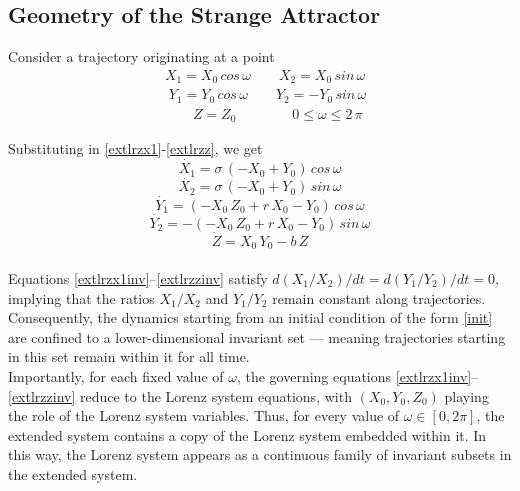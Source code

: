 \documentclass[paper=a4, fontsize=11pt]{scrartcl}
\numberwithin{equation}{section}		%
\numberwithin{figure}{section}			%
\numberwithin{table}{section}				%
\begin{document}
\subsection{Geometry of the Strange Attractor}
\noindent Consider a trajectory originating at a point 
\begin{equation}
	\begin{split}
		&X_1 = X_0 \, cos \, \omega \qquad X_2 = X_0 \, sin \, \omega \\
		& \; Y_1 = Y_0 \, cos \, \omega \qquad Y_2 = - Y_0 \, sin \, \omega \\
		& \qquad  Z = Z_0 \qquad \qquad  0 \leq \omega \leq 2 \, \pi
	\end{split} 
	\label{init}
\end{equation}

\noindent Substituting in \ref{extlrzx1}-\ref{extlrzz}, we get
\begin{equation}
	\dot{X_1} =  \sigma \, (-X_0 + Y_0) \, cos \, \omega
	\label{extlrzx1inv}
\end{equation}
\begin{equation}
	\dot{X_2} =  \sigma \, (-X_0 + Y_0) \, sin \, \omega
	\label{extlrzx2inv}
\end{equation}
\begin{equation}
	\dot{Y_1} = (-X_0 \, Z_0 + r \, X_0 - Y_0) \, cos \, \omega
	\label{extlrzy1inv}
\end{equation}
\begin{equation}
	\dot{Y_2} = -(-X_0 \, Z_0 + r \, X_0 - Y_0) \, sin \, \omega
	\label{extlrzy2inv}
\end{equation}
\begin{equation}
	\dot{Z} = X_0 \, Y_0 - b \, Z
	\label{extlrzzinv}
\end{equation}\\

Equations \ref{extlrzx1inv}–\ref{extlrzzinv} satisfy $d(X_1/X_2)/dt = d(Y_1/Y_2)/dt = 0$, implying that the ratios $X_1/X_2$ and $Y_1/Y_2$ remain constant along trajectories. Consequently, the dynamics starting from an initial condition of the form \eqref{init} are confined to a lower-dimensional invariant set — meaning trajectories starting in this set remain within it for all time.\\

Importantly, for each fixed value of $\omega$, the governing equations \ref{extlrzx1inv}–\ref{extlrzzinv} reduce to the Lorenz system equations, with $(X_0, Y_0, Z_0)$ playing the role of the Lorenz system variables. Thus, for every value of $\omega \in [0, 2\pi]$, the extended system contains a copy of the Lorenz system embedded within it. In this way, the Lorenz system appears as a continuous family of invariant subsets in the extended system.\\
\end{document}
